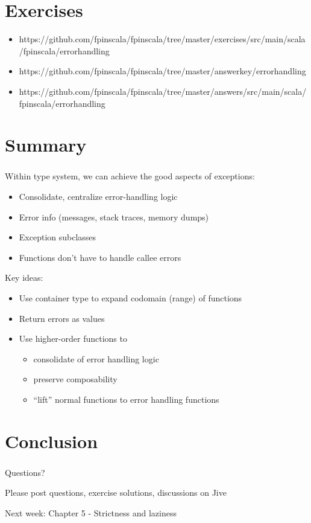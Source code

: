 \documentclass{beamer}
\begin{document}
\section{Exercises}

\begin{frame}{\secname}
  \begin{itemize}
    \item {\tiny https://github.com/fpinscala/fpinscala/tree/master/exercises/src/main/scala/fpinscala/errorhandling}
    \item {\tiny https://github.com/fpinscala/fpinscala/tree/master/answerkey/errorhandling}
    \item {\tiny https://github.com/fpinscala/fpinscala/tree/master/answers/src/main/scala/fpinscala/errorhandling}
  \end{itemize}
\end{frame}

\section*{Summary}

\begin{frame}
  \frametitle{\secname}
  Within type system, we can achieve the good aspects of exceptions:
  \begin{itemize}
    \item Consolidate, centralize error-handling logic
    \item Error info (messages, stack traces, memory dumps)
    \item Exception subclasses
    \item Functions don't have to handle callee errors
  \end{itemize}
  Key ideas:
  \begin{itemize}
    \item Use container type to expand codomain (range) of functions
    \item Return errors as values
    \item Use higher-order functions to
      \begin{itemize}
        \item consolidate of error handling logic
        \item preserve composability
        \item ``lift'' normal functions to error handling functions
      \end{itemize}
  \end{itemize}
\end{frame}

\section*{Conclusion}

\begin{frame}
  \frametitle{\secname}
  Questions?

  \bigskip
  Please post questions, exercise solutions, discussions on Jive

  \bigskip
  Next week: Chapter 5 - Strictness and laziness
\end{frame}
\end{document}
